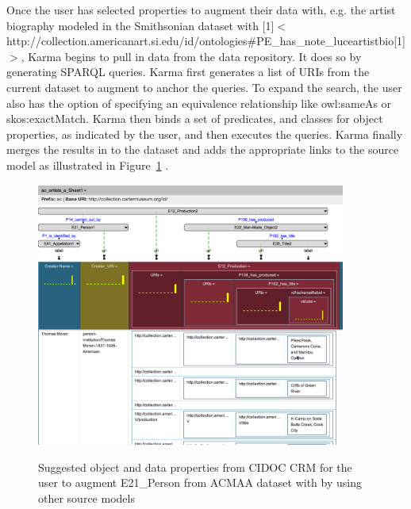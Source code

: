 Once the user has selected properties to augment their data with, e.g. the artist biography modeled in the Smithsonian dataset with \scalebox{.6}[1]{$<$}{http://collection.americanart.si.edu/id/ontologies\#PE\_has\_note\_luceartistbio}\scalebox{.6}[1]{$>$}, Karma begins to pull in data from the data repository.
It does so by generating SPARQL queries.  
Karma first generates a list of URIs from the current dataset to augment to anchor the queries.  
To expand the search, the user also has the option of specifying an equivalence relationship like owl:sameAs or skos:exactMatch.  
Karma then binds a set of predicates, and classes for object properties, as indicated by the user, and then executes the queries.  
Karma finally merges the results in to the dataset and adds the appropriate links to the source model as illustrated in Figure~\ref{fig:augment-screenshot}
.  
\begin{figure}
\begin{center}
\includegraphics[width=4.0in]{images/6-augment.png}
\vspace{-3mm}
\caption{Suggested object and data properties from CIDOC CRM for the user to augment E21\_Person from ACMAA dataset with by using other source models}
\vspace{-2mm}
\label{fig:augment-screenshot}
\end{center}
\vspace{-1.5em}
\end{figure}
